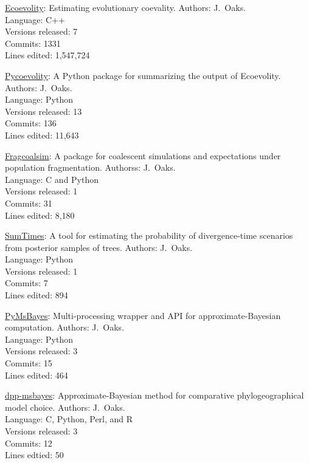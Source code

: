 \myHangIndent
\href{https://github.com/phyletica/ecoevolity}{Ecoevolity}:
    Estimating evolutionary coevality.
    Authors: J.\ Oaks. \\
    Language: C++ \\
    Versions released: 7 \\
    Commits: 1331 \\
    Lines edited: 1,547,724

\myHangIndent
\href{https://github.com/phyletica/sumcoevolity}{Pycoevolity}:
    A Python package for summarizing the output of Ecoevolity.
    Authors: J.\ Oaks. \\
    Language: Python \\
    Versions released: 13 \\
    Commits: 136 \\
    Lines edited: 11,643

\myHangIndent
\href{https://github.com/joaks1/fragcoalsim}{Fragcoalsim}:
    A package for coalescent simulations and expectations under population
    fragmentation.
    Authorss: J.\ Oaks. \\
    Language: C and Python \\
    Versions released: 1 \\
    Commits: 31 \\
    Lines edited: 8,180

\myHangIndent
\href{https://github.com/phyletica/SumTimes}{SumTimes}:
    A tool for estimating the probability of divergence-time scenarios from
    posterior samples of trees.
    Authors: J.\ Oaks. \\
    Language: Python \\
    Versions released: 1 \\
    Commits: 7 \\
    Lines edited: 894

\myHangIndent
\href{https://github.com/joaks1/PyMsBayes}{PyMsBayes}:
    Multi-processing wrapper and API for approximate-Bayesian
    computation.
    Authors: J.\ Oaks. \\
    Language: Python \\
    Versions released: 3 \\
    Commits: 15 \\
    Lines edited: 464

\myHangIndent
\href{https://github.com/joaks1/dpp-msbayes}{dpp-msbayes}:
    Approximate-Bayesian method for comparative phylogeographical model choice.
    Authors: J.\ Oaks. \\
    Language: C, Python, Perl, and R \\
    Versions released: 3 \\
    Commits: 12 \\
    Lines edtied: 50

